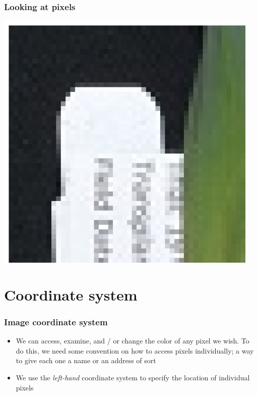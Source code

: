 \documentclass{beamer}
\begin{document}
\begin{frame}
	\frametitle{Looking at pixels}

	\includegraphics[width=0.95\textwidth]{../../fig/01-enlarged.jpg}
\end{frame}

\section{Coordinate system}

\begin{frame}
	\frametitle{Image coordinate system}

	\begin{itemize}
		\item We can access, examine, and / or change the color of any pixel we wish. To do this, we need some convention on how to access pixels individually; a way to give each one a name or an address of sort
		\item We use the {\em left-hand} coordinate system to specify the location of individual pixels
	\end{itemize}

\end{frame}
\end{document}

